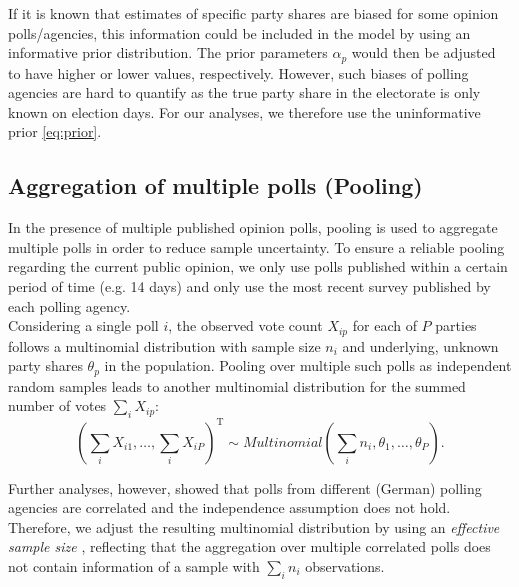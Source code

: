 \documentclass[smallextended]{svjour3}      %
\newcommand{\T}{\mathrm{\scriptscriptstyle T}}
\begin{document}
If it is known that estimates of specific party shares are biased for some opinion
polls/agencies, this information could be included in the model by using an
informative prior distribution. The prior parameters $\alpha_p$ would then
be adjusted to have higher or lower values, respectively.\label{p:inform_prior}
However, such biases of polling agencies are hard to quantify as the true party
share in the electorate is only known on election days. For our analyses, we
therefore use the uninformative prior \eqref{eq:prior}.

\subsection{Aggregation of multiple polls (Pooling)} \label{ssec:pooling}
In the presence of multiple published opinion polls, pooling is used to
aggregate multiple polls in order to reduce sample uncertainty. To ensure a
reliable pooling regarding the current public opinion, we only use polls
published within a certain period of time (e.g. 14 days)  and only use the most recent survey published by each polling agency.\\

Considering a single poll $i$, the observed vote count $X_{ip}$ for each of
$P$ parties follows a multinomial distribution with sample size $n_i$ and underlying,
unknown party shares $\theta_p$ in the population.
Pooling over multiple such polls as independent random samples leads to another
multinomial distribution for the summed number of votes $\sum_i X_{ip}$:
\begin{equation}
\left( \sum\limits_i X_{i1},\ldots, \sum\limits_i X_{iP} \right)^\T
  \sim Multinomial \left( \sum\limits_i n_i,\theta_1,\ldots,\theta_P\right).
\end{equation}

Further analyses, however, showed that polls from different (German) polling
agencies are correlated and the independence assumption does not hold. Therefore,
we adjust the resulting multinomial distribution by using an
\textit{effective sample size} \citep{hanley_2003}, reflecting that the aggregation
over multiple correlated polls does not contain information of a sample with
$\sum_i n_i$ observations.\\
\end{document}
